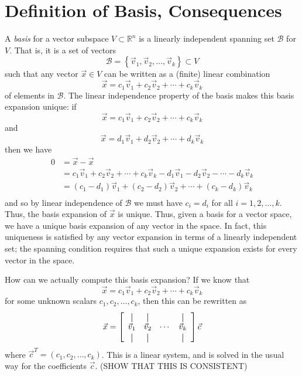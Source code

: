 \section{Definition of Basis, Consequences}
A \textit{basis} for a vector subspace $V \subset \mathbb{R}^n$ is a linearly independent spanning set $\mathcal{B}$ for $V$. That is, it is a set of vectors \[ \mathcal{B} = \left\{ \vec{v}_1, \vec{v}_2, \ldots, \vec{v}_k \right\} \subset V \]  such that any vector $\vec{x} \in V$ can be written as a (finite) linear combination \[ \vec{x} = c_1 \vec{v}_1 + c_2 \vec{v}_2 + \cdots + c_k \vec{v}_k \] of elements in $\mathcal{B}$. The linear independence property of the basis makes this basis expansion unique: if \[ \vec{x} = c_1 \vec{v}_1 + c_2 \vec{v}_2 + \cdots + c_k \vec{v}_k \] and \[ \vec{x} = d_1 \vec{v}_1 + d_2 \vec{v}_2 + \cdots + d_k \vec{v}_k \] then we have 
\[\begin{split}
 0 & = \vec{x} - \vec{x} \\
 & = c_1 \vec{v}_1 + c_2 \vec{v}_2 + \cdots + c_k \vec{v}_k - d_1 \vec{v}_1 - d_2 \vec{v}_2 - \cdots - d_k \vec{v}_k \\
 & = \left(c_1 - d_1\right) \vec{v}_1 + \left(c_2 - d_2\right) \vec{v}_2 + \cdots + \left(c_k - d_k\right) \vec{v}_k \\
\end{split} \] and so by linear independence of $\mathcal{B}$ we must have $c_i = d_i$ for all $i=1,2,\ldots,k$. Thus, the basis expansion of $\vec{x}$ is unique. Thus, given a basis for a vector space, we have a unique basis expansion of any vector in the space. In fact, this uniqueness is satisfied by any vector expansion in terms of a linearly independent set; the spanning condition requires that such a unique expansion exists for every vector in the space.

How can we actually compute this basis expansion? If we know that \[ \vec{x} = c_1 \vec{v}_1 + c_2 \vec{v}_2 + \cdots + c_k \vec{v}_k \] for some unknown scalars $c_1, c_2,\ldots, c_k$, then this can be rewritten as
\[ \vec{x} = \left[ \begin{array}{cccc}
\vertbar & \vertbar & & \vertbar \\
\vec{v}_1 & \vec{v}_2 & \cdots & \vec{v}_k \\
\vertbar & \vertbar & & \vertbar \\
\end{array} \right] \vec{c} \] where $\vec{c}^T = \left(c_1,c_2,\ldots, c_k\right)$. This is a linear system, and is solved in the usual way for the coefficients $\vec{c}$. (SHOW THAT THIS IS CONSISTENT)


